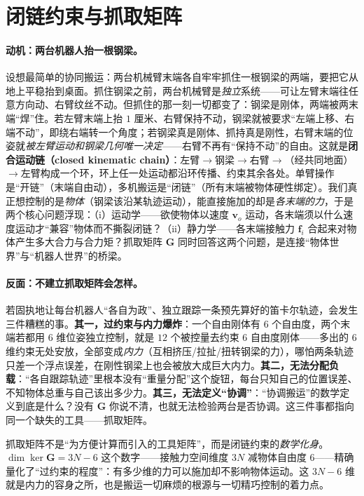 \section{闭链约束与抓取矩阵}
\label{sec:cm-grasp}

\paragraph{动机：两台机器人抬一根钢梁。}
设想最简单的协同搬运：两台机械臂末端各自牢牢抓住一根钢梁的两端，要把它从地上平稳抬到桌面。抓住钢梁之前，两台机械臂是\emph{独立}系统——可让左臂末端往任意方向动、右臂纹丝不动。但抓住的那一刻一切都变了：钢梁是刚体，两端被两末端“焊”住。若左臂末端上抬 $1$ 厘米、右臂保持不动，钢梁就被要求“左端上移、右端不动”，即绕右端转一个角度；若钢梁真是刚体、抓持真是刚性，右臂末端的位姿就\emph{被左臂运动和钢梁几何唯一决定}——右臂不再有“保持不动”的自由。这就是\textbf{闭合运动链（closed kinematic chain）}：左臂$\to$钢梁$\to$右臂$\to$（经共同地面）$\to$左臂构成一个环，环上任一处运动都沿环传播、约束其余各处。单臂操作是“开链”（末端自由动），多机搬运是“闭链”（所有末端被物体硬性绑定）。我们真正想控制的是\emph{物体}（钢梁该沿某轨迹运动），能直接施加的却是\emph{各末端的力}，于是两个核心问题浮现：（i）运动学——欲使物体以速度 $\mathbf{v}_o$ 运动，各末端须以什么速度运动才“兼容”物体而不撕裂闭链？（ii）静力学——各末端接触力 $\mathbf{f}_i$ 合起来对物体产生多大合力与合力矩？抓取矩阵 $\mathbf{G}$ 同时回答这两个问题，是连接“物体世界”与“机器人世界”的桥梁。

\paragraph{反面：不建立抓取矩阵会怎样。}
若固执地让每台机器人“各自为政”、独立跟踪一条预先算好的笛卡尔轨迹，会发生三件糟糕的事。\textbf{其一，过约束与内力爆炸}：一个自由刚体有 $6$ 个自由度，两个末端若都用 $6$ 维位姿独立控制，就是 $12$ 个被控量去约束 $6$ 自由度刚体——多出的 $6$ 维约束无处安放，全部变成\emph{内力}（互相挤压/拉扯/扭转钢梁的力），哪怕两条轨迹只差一个浮点误差，在刚性钢梁上也会被放大成巨大内力。\textbf{其二，无法分配负载}：“各自跟踪轨迹”里根本没有“重量分配”这个旋钮，每台只知自己的位置误差、不知物体总重与自己该出多少力。\textbf{其三，无法定义“协调”}：“协调搬运”的数学定义到底是什么？没有 $\mathbf{G}$ 你说不清，也就无法检验两台是否协调。这三件事都指向同一个缺失的工具——抓取矩阵。

\begin{insight}[抓取矩阵是闭链约束的数学化身]
抓取矩阵不是“为方便计算而引入的工具矩阵”，而是闭链约束的\emph{数学化身}。$\dim\ker\mathbf{G}=3N-6$ 这个数字——接触力空间维度 $3N$ 减物体自由度 $6$——精确量化了“过约束的程度”：有多少维的力可以施加却不影响物体运动。这 $3N-6$ 维就是内力的容身之所，也是搬运一切麻烦的根源与一切精巧控制的着力点。
\end{insight}


